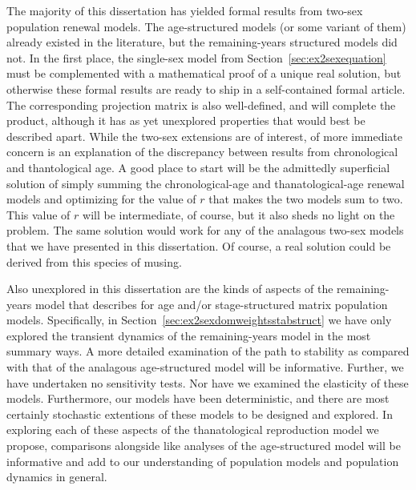 The majority of this dissertation has yielded formal results from
two-sex population renewal models. The age-structured models (or some variant
of them) already existed in the literature, but the remaining-years structured
models did not. In the first place, the single-sex model from
Section~\ref{sec:ex2sexequation} must be complemented with a mathematical proof 
of a unique real solution, but otherwise these formal results are ready to ship
in a self-contained formal article. The corresponding projection matrix is also
well-defined, and will complete the product, although it has as
yet unexplored properties that would best be described apart. While the two-sex
extensions are of interest, of more immediate concern is an explanation of
the discrepancy between results from chronological and thantological age. A good
place to start will be the admittedly superficial solution of simply summing the
chronological-age and thanatological-age renewal models and optimizing for the
value of $r$ that makes the two models sum to two. This value of $r$ will be
intermediate, of course, but it also sheds no light on the problem. The same
solution would work for any of the analagous two-sex models that we have
presented in this dissertation. Of course, a real solution could be derived from
this species of musing.

Also unexplored in this dissertation are the kinds of aspects of the
remaining-years model that \citet{caswell2001matrix} describes for age and/or
stage-structured matrix population models. Specifically, in
Section~\ref{sec:ex2sexdomweightsstabstruct} we have only explored the transient 
dynamics of the remaining-years model in the most summary ways. A more detailed
examination of the path to stability as compared with that of the analagous
age-structured model will be informative. Further, we have undertaken no
sensitivity tests. Nor have we examined the elasticity of these models.
Furthermore, our models have been deterministic, and there are most certainly
stochastic extentions of these models to be designed and explored. In exploring
each of these aspects of the thanatological reproduction model we propose,
comparisons alongside like analyses of the age-structured model will be
informative and add to our understanding of population models and population
dynamics in general.





